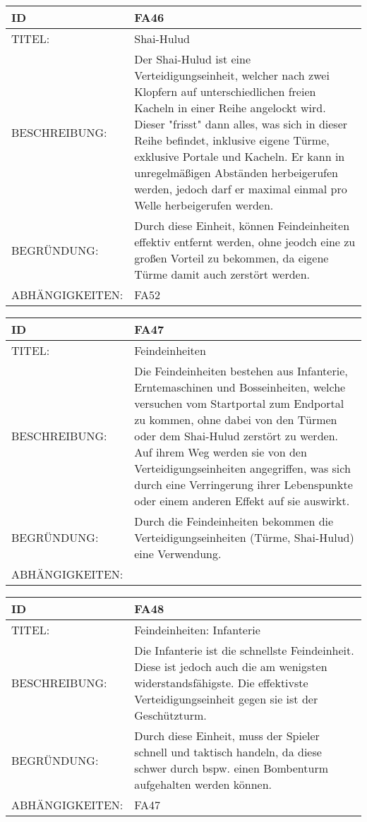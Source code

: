 \documentclass{uulm-assignment}
\begin{document}
\begin{tabularx}{16cm}{l|X}
\textbf{ID} & \textbf{FA46} \\
\hline
TITEL: & Shai-Hulud \\
\hline
BESCHREIBUNG: & Der Shai-Hulud ist eine Verteidigungseinheit, welcher nach zwei Klopfern auf unterschiedlichen freien Kacheln in einer Reihe angelockt wird. Dieser "frisst" dann alles, was sich in dieser Reihe befindet, inklusive eigene Türme, exklusive Portale und Kacheln. Er kann in unregelmäßigen Abständen herbeigerufen werden, jedoch darf er maximal einmal pro Welle herbeigerufen werden.
\\
\hline
BEGRÜNDUNG: & Durch diese Einheit, können Feindeinheiten effektiv entfernt werden, ohne jeodch eine zu großen Vorteil zu bekommen, da eigene Türme damit auch zerstört werden. \\
\hline
ABHÄNGIGKEITEN: & FA52\\
\end{tabularx}

\begin{tabularx}{16cm}{l|X}
\textbf{ID} & \textbf{FA47} \\
\hline
TITEL: &Feindeinheiten \\
\hline
BESCHREIBUNG: & Die Feindeinheiten bestehen aus Infanterie, Erntemaschinen und Bosseinheiten, welche versuchen vom Startportal zum Endportal zu kommen, ohne dabei von den Türmen oder dem Shai-Hulud zerstört zu werden. Auf ihrem Weg werden sie von den Verteidigungseinheiten angegriffen, was sich durch eine Verringerung ihrer Lebenspunkte oder einem anderen Effekt auf sie auswirkt. 
\\
\hline
BEGRÜNDUNG: & Durch die Feindeinheiten bekommen die Verteidigungseinheiten (Türme, Shai-Hulud) eine Verwendung.\\
\hline
ABHÄNGIGKEITEN: & \\
\end{tabularx}

\begin{tabularx}{16cm}{l|X}
\textbf{ID} & \textbf{FA48} \\
\hline
TITEL: & Feindeinheiten: Infanterie \\
\hline
BESCHREIBUNG: & Die Infanterie ist die schnellste Feindeinheit. Diese ist jedoch auch die am wenigsten widerstandsfähigste. Die effektivste Verteidigungseinheit gegen sie ist der Geschützturm.
\\
\hline
BEGRÜNDUNG: & Durch diese Einheit, muss der Spieler schnell und taktisch handeln, da diese schwer durch bspw. einen Bombenturm aufgehalten werden können. \\
\hline
ABHÄNGIGKEITEN: & FA47\\ 
\end{tabularx}
\end{document}
